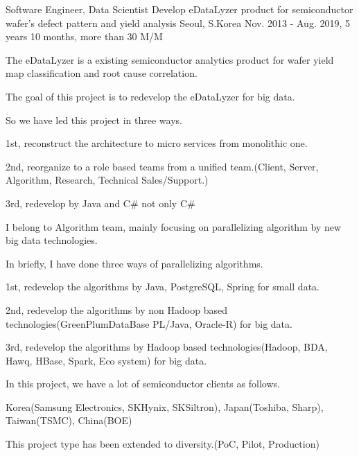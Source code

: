 

\begin{cventries}

  \cventry
    {Software Engineer, Data Scientist} %
    {Develop eDataLyzer product for semiconductor wafer's defect pattern and yield analysis} %
    {Seoul, S.Korea} %
    {Nov. 2013 - Aug. 2019, 5 years 10 months, more than 30 M/M} %
    {
      \begin{cvitems} %
        \item {The eDataLyzer is a existing semiconductor analytics product for wafer yield map classification and root cause correlation.}
        \item {The goal of this project is to redevelop the eDataLyzer for big data.}
        \item {So we have led this project in three ways.}
        \item {1st, reconstruct the architecture to micro services from monolithic one.}
        \item {2nd, reorganize to a role based teams from a unified team.(Client, Server, Algorithm, Research, Technical Sales/Support.)}
        \item {3rd, redevelop by Java and C\# not only C\#}
        \item {I belong to Algorithm team, mainly focusing on parallelizing algorithm by new big data technologies.}
        \item {In briefly, I have done three ways of parallelizing algorithms.}
        \item {1st, redevelop the algorithms by Java, PostgreSQL, Spring for small data.}
        \item {2nd, redevelop the algorithms by non Hadoop based technologies(GreenPlumDataBase PL/Java, Oracle-R) for big data.}
        \item {3rd, redevelop the algorithms by Hadoop based technologies(Hadoop, BDA, Hawq, HBase, Spark, Eco system) for big data.}
        \item {In this project, we have a lot of semiconductor clients as follows.}
        \item {Korea(Samsung Electronics, SKHynix, SKSiltron), Japan(Toshiba, Sharp), Taiwan(TSMC), China(BOE)}
        \item {This project type has been extended to diversity.(PoC, Pilot, Production)}
      \end{cvitems}
    }


\end{cventries}
